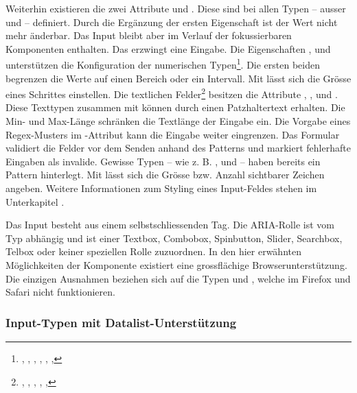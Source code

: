 Weiterhin existieren die zwei Attribute  und . 
Diese sind bei allen Typen – ausser  und  – definiert. 
Durch die Ergänzung der ersten Eigenschaft ist der Wert nicht mehr änderbar. 
Das Input bleibt aber im Verlauf der fokussierbaren Komponenten enthalten. 
Das  erzwingt eine Eingabe. 
Die Eigenschaften ,  und  unterstützen die Konfiguration der numerischen Typen\footnote{
    , , , , , , 
}. 
Die ersten beiden begrenzen die Werte auf einen Bereich oder ein Intervall. 
Mit  lässt sich die Grösse eines Schrittes einstellen. 
Die textlichen Felder\footnote{
    , , , , , 
} besitzen die Attribute , ,  und . 
Diese Texttypen zusammen mit  können durch  einen Patzhaltertext erhalten. 
Die Min- und Max-Länge schränken die Textlänge der Eingabe ein. 
Die Vorgabe eines Regex-Musters im -Attribut kann die Eingabe weiter eingrenzen. 
Das Formular validiert die Felder vor dem Senden anhand des Patterns und markiert fehlerhafte Eingaben als invalide.
Gewisse Typen – wie z. B. ,  und  – haben bereits ein Pattern hinterlegt. 
Mit  lässt sich die Grösse bzw. Anzahl sichtbarer Zeichen angeben. 
Weitere Informationen zum Styling eines Input-Feldes stehen im Unterkapitel \textbf{}. 

Das Input besteht aus einem selbstschliessenden Tag. 
Die ARIA-Rolle ist vom Typ abhängig und ist einer Textbox, Combobox, Spinbutton, Slider, Searchbox, Telbox oder keiner speziellen Rolle zuzuordnen.  
In den hier erwähnten Möglichkeiten der Komponente existiert eine grossflächige Browserunterstützung. 
Die einzigen Ausnahmen beziehen sich auf die Typen  und , welche im Firefox und Safari nicht funktionieren. 


\subsubsection{{\color{dgray} Input-Typen mit Datalist-Unterstützung}}
\label{sec:inputTypesDatalist}

